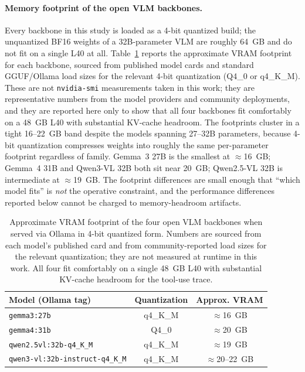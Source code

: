 \documentclass[12pt,letterpaper,oneside]{article}
\begin{document}
\paragraph{Memory footprint of the open VLM backbones.}
Every backbone in this study is loaded as a 4-bit quantized build;
the unquantized BF16 weights of a 32B-parameter VLM are roughly
64~GB and do not fit on a single L40 at all.  Table~\ref{tab:vlmspec}
reports the approximate VRAM footprint for each backbone, sourced
from published model cards and standard GGUF/Ollama load sizes for
the relevant 4-bit quantization (Q4\_0 or q4\_K\_M).  These are not
\texttt{nvidia-smi} measurements taken in this work; they are
representative numbers from the model providers and community
deployments, and they are reported here only to show that all four
backbones fit comfortably on a 48~GB L40 with substantial KV-cache
headroom.  The footprints cluster in a tight 16--22~GB band despite
the models spanning 27--32B parameters, because 4-bit quantization
compresses weights into roughly the same per-parameter footprint
regardless of family. Gemma~3 27B is the smallest at $\approx$16~GB;
Gemma~4 31B and Qwen3-VL 32B both sit near 20~GB; Qwen2.5-VL 32B is
intermediate at $\approx$19~GB. The footprint differences are small
enough that ``which model fits'' is \emph{not} the operative
constraint, and the performance differences reported below cannot be
charged to memory-headroom artifacts.

\begin{table}[ht]
  \centering
  \caption{Approximate VRAM footprint of the four open VLM backbones
    when served via Ollama in 4-bit quantized form.  Numbers are
    sourced from each model's published card and from
    community-reported load sizes for the relevant quantization;
    they are not measured at runtime in this work.  All four fit
    comfortably on a single 48~GB L40 with substantial KV-cache
    headroom for the tool-use trace.}
  \label{tab:vlmspec}
  \small
  \begin{tabular}{@{}lcc@{}}
    \toprule
    Model (Ollama tag) & Quantization & Approx. VRAM \\
    \midrule
    \texttt{gemma3:27b}                     & q4\_K\_M & $\approx$16~GB \\
    \texttt{gemma4:31b}                     & Q4\_0    & $\approx$20~GB \\
    \texttt{qwen2.5vl:32b-q4\_K\_M}         & q4\_K\_M & $\approx$19~GB \\
    \texttt{qwen3-vl:32b-instruct-q4\_K\_M} & q4\_K\_M & $\approx$20--22~GB \\
    \bottomrule
  \end{tabular}
\end{table}
\end{document}
